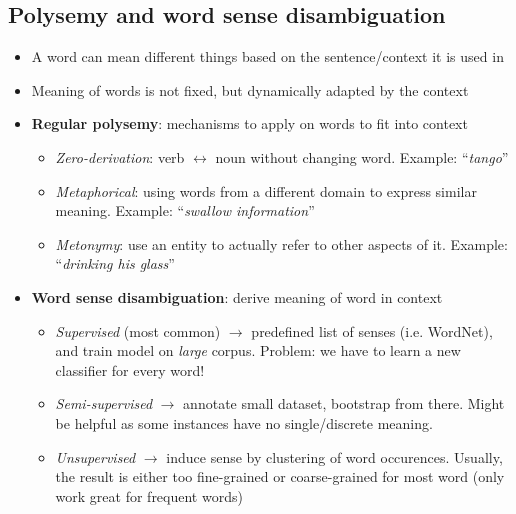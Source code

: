 \subsection{Polysemy and word sense disambiguation}
\begin{itemize}
	\item A word can mean different things based on the sentence/context it is used in
	\item Meaning of words is not fixed, but dynamically adapted by the context
	\item \textbf{Regular polysemy}: mechanisms to apply on words to fit into context
	\begin{itemize}
		\item \textit{Zero-derivation}: verb $\leftrightarrow$ noun without changing word. Example: ``\textit{tango}''
		\item \textit{Metaphorical}: using words from a different domain to express similar meaning. Example: ``\textit{swallow information}''
		\item \textit{Metonymy}: use an entity to actually refer to other aspects of it. 
		Example: ``\textit{drinking his glass}''
	\end{itemize}
	\item \textbf{Word sense disambiguation}: derive meaning of word in context
	\begin{itemize}
		\item \textit{Supervised} (most common) $\to$ predefined list of senses (i.e. WordNet), and train model on \textit{large} corpus. Problem: we have to learn a new classifier for every word!
		\item \textit{Semi-supervised} $\to$ annotate small dataset, bootstrap from there. Might be helpful as some instances have no single/discrete meaning.
		\item \textit{Unsupervised} $\to$ induce sense by clustering of word occurences. Usually, the result is either too fine-grained or coarse-grained for most word (only work great for frequent words)
	\end{itemize}
\end{itemize}
